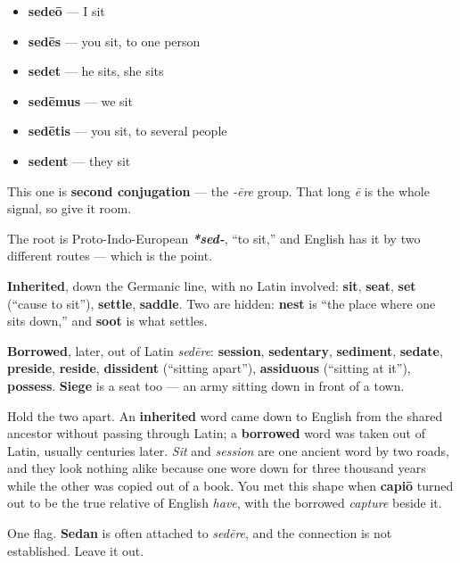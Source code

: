 \begin{itemize}
\raggedright
  \item \textbf{sedeō} — I sit
  \item \textbf{sedēs} — you sit, to one person
  \item \textbf{sedet} — he sits, she sits
  \item \textbf{sedēmus} — we sit
  \item \textbf{sedētis} — you sit, to several people
  \item \textbf{sedent} — they sit
\end{itemize}

This one is \textbf{second conjugation} — the \emph{-ēre} group. That long \emph{ē} is the whole signal, so give it room.

\begin{cousinweb}
The root is Proto-Indo-European \emph{\textbf{*sed-}}, \textquotedblleft{}to sit,\textquotedblright{} and English has it by two different routes — which is the point.

\textbf{Inherited}, down the Germanic line, with no Latin involved: \textbf{sit}, \textbf{seat}, \textbf{set} (\textquotedblleft{}cause to sit\textquotedblright{}), \textbf{settle}, \textbf{saddle}. Two are hidden: \textbf{nest} is \textquotedblleft{}the place where one sits down,\textquotedblright{} and \textbf{soot} is what settles.

\textbf{Borrowed}, later, out of Latin \emph{sedēre}: \textbf{session}, \textbf{sedentary}, \textbf{sediment}, \textbf{sedate}, \textbf{preside}, \textbf{reside}, \textbf{dissident} (\textquotedblleft{}sitting apart\textquotedblright{}), \textbf{assiduous} (\textquotedblleft{}sitting at it\textquotedblright{}), \textbf{possess}. \textbf{Siege} is a seat too — an army sitting down in front of a town.

Hold the two apart. An \textbf{inherited} word came down to English from the shared ancestor without passing through Latin; a \textbf{borrowed} word was taken out of Latin, usually centuries later. \emph{Sit} and \emph{session} are one ancient word by two roads, and they look nothing alike because one wore down for three thousand years while the other was copied out of a book. You met this shape when \textbf{capiō} turned out to be the true relative of English \emph{have}, with the borrowed \emph{capture} beside it.

One flag. \textbf{Sedan} is often attached to \emph{sedēre}, and the connection is not established. Leave it out.
\end{cousinweb}

